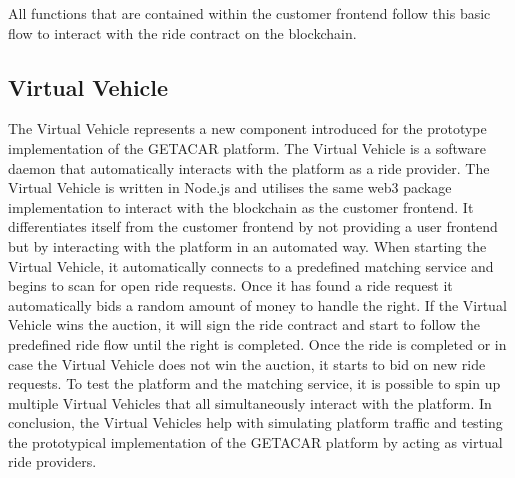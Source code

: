 All functions that are contained within the customer frontend follow this basic flow to interact with the ride contract on the blockchain.


\subsection{Virtual Vehicle}
The Virtual Vehicle represents a new component introduced for the prototype implementation of the GETACAR platform. The Virtual Vehicle is a software daemon that automatically interacts with the platform as a ride provider. The Virtual Vehicle is written in Node.js and utilises the same web3 package implementation to interact with the blockchain as the customer frontend. It differentiates itself from the customer frontend by not providing a user frontend but by interacting with the platform in an automated way. When starting the Virtual Vehicle, it automatically connects to a predefined matching service and begins to scan for open ride requests. Once it has found a ride request it automatically bids a random amount of money to handle the right. If the Virtual Vehicle wins the auction, it will sign the ride contract and start to follow the predefined ride flow until the right is completed. Once the ride is completed or in case the Virtual Vehicle does not win the auction, it starts to bid on new ride requests. To test the platform and the matching service, it is possible to spin up multiple Virtual Vehicles that all simultaneously interact with the platform. 
In conclusion, the Virtual Vehicles help with simulating platform traffic and testing the prototypical implementation of the GETACAR platform by acting as virtual ride providers. 